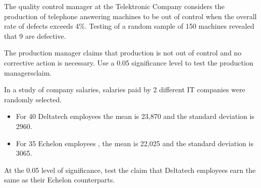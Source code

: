 
 
The quality control manager at the Telektronic Company considers the production of telephone answering machines to be out of control when the overall rate of defects exceeds 4\%.
 Testing of a random sample of 150 machines revealed that 9 are defective. 

The production manager claims that production is not out of control and no corrective action is necessary. Use a 0.05 significance level to test the production managersclaim.
 
 \item In a study of company salaries, salaries paid by 2 different IT companies were randomly selected.
 
 \begin{itemize}
 \item For 40 Deltatech employees the mean is 23,870 and the standard deviation is 2960.
 \item For 35 Echelon employees , the mean is 22,025 and the standard deviation is 3065.
 \end{itemize}
 
 At the 0.05 level of significance, test the claim that Deltatech employees earn the same as their  Echelon counterparts.
 
